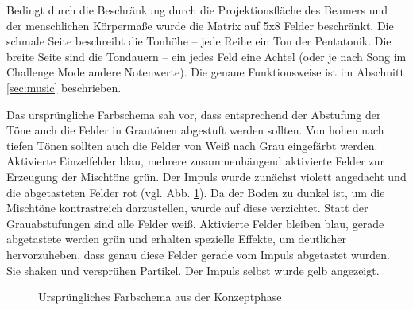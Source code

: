 
Bedingt durch die Beschränkung durch die Projektionsfläche des Beamers und der menschlichen Körpermaße wurde die Matrix auf 5x8 Felder beschränkt. Die schmale Seite beschreibt die Tonhöhe – jede Reihe ein Ton der Pentatonik. Die breite Seite sind die Tondauern – ein jedes Feld eine Achtel (oder je nach Song im Challenge Mode andere Notenwerte). Die genaue Funktionsweise ist im Abschnitt \ref{sec:music} beschrieben.

Das ursprüngliche Farbschema sah vor, dass entsprechend der Abstufung der Töne auch die Felder in Grautönen abgestuft werden sollten. Von hohen nach tiefen Tönen sollten auch die Felder von Weiß nach Grau eingefärbt werden. Aktivierte Einzelfelder blau, mehrere zusammenhängend aktivierte Felder zur Erzeugung der Mischtöne grün. Der Impuls wurde zunächst violett angedacht und die abgetasteten Felder rot (vgl. Abb. \ref{fig:design}). Da der Boden zu dunkel ist, um die Mischtöne kontrastreich darzustellen, wurde auf diese verzichtet. Statt der Grauabstufungen sind alle Felder weiß. Aktivierte Felder bleiben blau, gerade abgetastete werden grün und erhalten spezielle Effekte, um deutlicher hervorzuheben, dass genau diese Felder gerade vom Impuls abgetastet wurden. Sie shaken und versprühen Partikel. Der Impuls selbst wurde gelb angezeigt.

\begin{figure}[htbp]
\hfill
{}
\caption{Ursprüngliches Farbschema aus der Konzeptphase}
\label{fig:design}
\end{figure}

